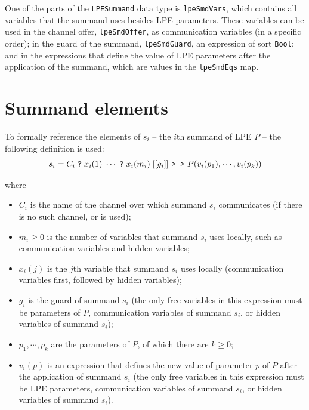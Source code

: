 One of the parts of the \texttt{LPESummand} data type is \texttt{lpeSmdVars}, which contains all variables that the summand uses besides LPE parameters.
These variables can be used in the channel offer, \texttt{lpeSmdOffer}, as communication variables (in a specific order); in the guard of the summand, \texttt{lpeSmdGuard}, an expression of sort \texttt{Bool}; and in the expressions that define the value of LPE parameters after the application of the summand, which are values in the \texttt{lpeSmdEqs} map.

\section{Summand elements} \label{summandelements}

To formally reference the elements of $s_i$ -- the $i$th summand of LPE $P$ -- the following definition is used:
\begin{align*}
s_i = C_i \; \texttt{?} \; x_i(1) \; \cdots{} \; \texttt{?} \; x_i(m_i) \; [[g_i]] \text{ \texttt{>->} } P(v_i(p_1), \cdots{}, v_i(p_k))
\end{align*}

where

\begin{itemize}
\item $C_i$ is the name of the channel over which summand $s_i$ communicates (if there is no such channel, \istep{} or \cistep{} is used);
\item $m_i \geq 0$ is the number of variables that summand $s_i$ uses locally, such as communication variables and hidden variables;
\item $x_i(j)$ is the $j$th variable that summand $s_i$ uses locally (communication variables first, followed by hidden variables);
\item $g_i$ is the guard of summand $s_i$ (the only free variables in this expression must be parameters of $P$, communication variables of summand $s_i$, or hidden variables of summand $s_i$);
\item $p_1, \cdots{}, p_k$ are the parameters of $P$, of which there are $k \geq 0$;
\item $v_i(p)$ is an expression that defines the new value of parameter $p$ of $P$ after the application of summand $s_i$ (the only free variables in this expression must be LPE parameters, communication variables of summand $s_i$, or hidden variables of summand $s_i$).
\end{itemize}

